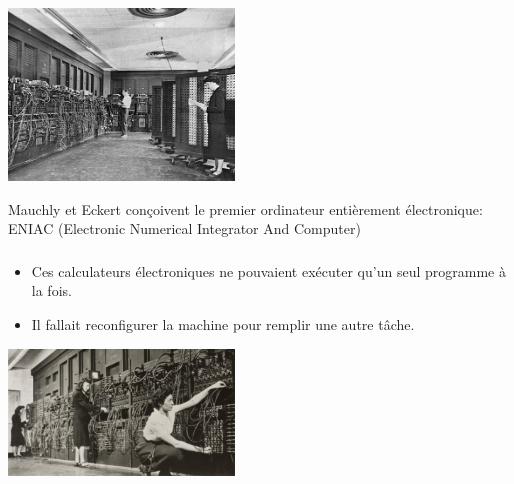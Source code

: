 \documentclass[svgnames,11pt]{beamer}
\begin{document}
\begin{frame}
    \frametitle{}

    \begin{center}
    \centering
    \includegraphics[width=6cm]{ressources/eniac.jpg}
    \end{center}
\begin{aretenir}[1945]
    Mauchly et Eckert conçoivent le premier ordinateur entièrement électronique: ENIAC (Electronic Numerical Integrator And Computer)
\end{aretenir}
\end{frame}
\begin{frame}
    \frametitle{}

\begin{itemize}
    \item Ces calculateurs électroniques ne pouvaient exécuter qu'un seul programme à la fois.
    \item Il fallait reconfigurer la machine pour remplir une autre tâche.
\end{itemize}
\begin{center}
\centering
\includegraphics[width=6cm]{ressources/configeniac.jpg}
\label{IMG}
\end{center}
\end{frame}
\end{document}
